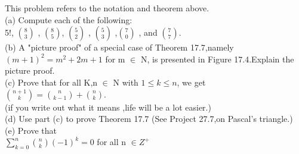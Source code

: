 \documentclass[11pt, a4paper, UTF8]{ctexart}
\begin{document}
\begin{problem}[UD:17.19]
This problem refers to the notation and theorem above.\\
(a) Compute each of the following:\\
5!, $\binom{8}{3}$ , $\binom{8}{5}$, $\binom{5}{2}$ , $\binom{5}{3}$ ,$\binom{7}{0}$ , and $\binom{7}{7}$.\\
(b) A "picture proof" of a special case of Theorem 17.7,namely $(m+1)^2=m^2  +  2m  +  1$ for m $\in$ N, is presented in Figure 17.4.Explain the picture proof.\\
(c) Prove that for all K,n $\in$ N with $1 \le k \le n$, we get \\
          $\binom{n+1}{k} = \binom{n}{k-1}  +  \binom{n}{k}$.\\
          (if you write out what it means ,life will be a lot easier.)\\
(d) Use part (c) to prove Theorem 17.7 (See Project 27.7,on Pascal's triangle.)\\
(e) Prove that \\
      $\sum\limits_{k=0}^{n}\binom{n}{k}(-1)^k  =  0$ for all n $\in  Z^+$ 
\end{problem}
\end{document}

